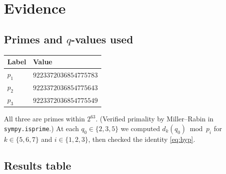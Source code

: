 \documentclass[11pt]{article}
\theoremstyle{definition}
\begin{document}
\section{Evidence}

\subsection{Primes and $q$-values used}

\begin{center}
\begin{tabular}{ll}
\toprule
Label & Value \\
\midrule
$p_1$ & $9223372036854775783$ \\
$p_2$ & $9223372036854775643$ \\
$p_3$ & $9223372036854775549$ \\
\bottomrule
\end{tabular}
\end{center}

All three are primes within $2^{63}$. (Verified primality by Miller--Rabin in \texttt{sympy.isprime}.)  At each $q_0 \in \{2, 3, 5\}$ we computed $d_k(q_0) \bmod p_i$ for $k \in \{5, 6, 7\}$ and $i \in \{1, 2, 3\}$, then checked the identity \eqref{eq:hyp}.

\subsection{Results table}
\end{document}
